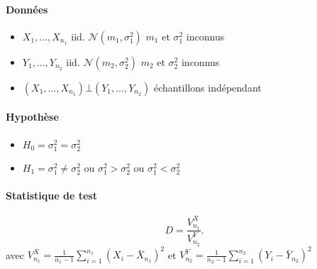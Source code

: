 \documentclass{article}
\theoremstyle{plain}%
\theoremstyle{definition}
\theoremstyle{remark}
\begin{document}
\paragraph*{Données}\begin{itemize}
    \item $ X_1, \dots, X_{n_1}  $ iid. $ \mathcal{N}(m_1, \sigma_1 ^2)$ $ m_1 $ et $ \sigma_1^2 $ inconnus
    \item $ Y_1, \dots, Y_{n_2}  $ iid. $ \mathcal{N}(m_2, \sigma_2 ^2)$ $ m_2 $ et $ \sigma_2^2 $ inconnus
    \item $ (X_1, \dots, X_{n_1}) \bot (Y_1, \dots, Y_{n_2})$ échantillons indépendant
\end{itemize}

\paragraph*{Hypothèse}
\begin{itemize}
    \item $ H_0 = \sigma _1^2 = \sigma _2^2 $ 
    \item $ H_1 = \sigma _1^2 \neq \sigma _2^2 $ ou $\sigma _1^2 > \sigma _2^2 $ ou $ \sigma _1^2 < \sigma _2^2 $
\end{itemize}

\paragraph*{Statistique de test}
\[
    D = \frac{V_{n_1}^X}{V_{n_2}^Y}
.\]
avec $ V_{n_1}^X = \frac{1}{n_1 - 1} \sum_{i=1}^{n_1}(X_i - \bar{X}_{n_1})^2 $ et $ V_{n_2}^Y = \frac{1}{n_2 - 1} \sum_{i=1}^{n_2}(Y_i - \bar{Y}_{n_2})^2 $ 
\end{document}
